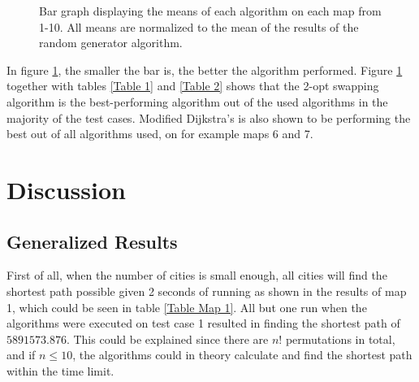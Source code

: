 \documentclass{article}
\begin{document}
\begin{figure}[H]
\caption{Bar graph displaying the means of each algorithm on each map from 1-10. All means are normalized to the mean of the results of the random generator algorithm.} \label{MeanDiagram}
\end{figure}

In figure \ref{MeanDiagram}, the smaller the bar is, the better the algorithm performed. Figure \ref{MeanDiagram} together with tables \ref{Table 1} and \ref{Table 2} shows that the 2-opt swapping algorithm is the best-performing algorithm out of the used algorithms in the majority of the test cases. Modified Dijkstra's is also shown to be performing the best out of all algorithms used, on for example maps 6 and 7. 


\section{Discussion}\label{sec4}

\subsection{Generalized Results}\label{subsec1}
First of all, when the number of cities is small enough, all cities will find the shortest path possible given 2 seconds of running as shown in the results of map 1, which could be seen in table \ref{Table Map 1}. All but one run when the algorithms were executed on test case 1 resulted in finding the shortest path of $5891573.876$. This could be explained since there are $n!$ permutations in total, and if $n\leq 10$, the algorithms could in theory calculate and find the shortest path within the time limit.
\end{document}
